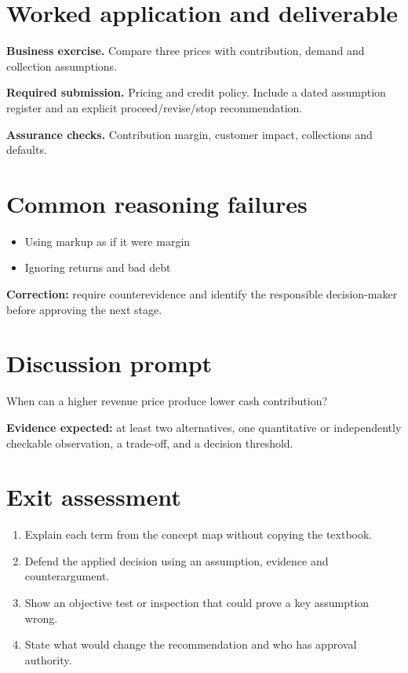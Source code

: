 \documentclass[11pt,letterpaper]{article}
\begin{document}
\section{Worked application and deliverable}
\textbf{Business exercise.} Compare three prices with contribution, demand and collection assumptions.\par\textbf{Required submission.} Pricing and credit policy. Include a dated assumption register and an explicit proceed/revise/stop recommendation.\par\textbf{Assurance checks.} Contribution margin, customer impact, collections and defaults.
\section{Common reasoning failures}
\begin{itemize}[leftmargin=*,itemsep=3pt]
\item Using markup as if it were margin
\item Ignoring returns and bad debt
\end{itemize}
\noindent\textbf{Correction:} require counterevidence and identify the responsible decision-maker before approving the next stage.
\section{Discussion prompt}
When can a higher revenue price produce lower cash contribution?\par\medskip\textbf{Evidence expected:} at least two alternatives, one quantitative or independently checkable observation, a trade-off, and a decision threshold.
\section{Exit assessment}
\begin{enumerate}[leftmargin=*,itemsep=5pt]
\item Explain each term from the concept map without copying the textbook.
\item Defend the applied decision using an assumption, evidence and counterargument.
\item Show an objective test or inspection that could prove a key assumption wrong.
\item State what would change the recommendation and who has approval authority.
\end{enumerate}

\end{document}
